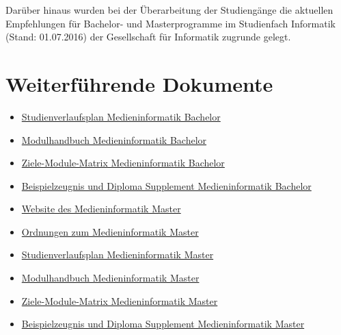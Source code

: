 Darüber hinaus wurden bei der Überarbeitung der Studiengänge die
aktuellen Empfehlungen für Bachelor- und Masterprogramme im Studienfach
Informatik (Stand: 01.07.2016) der Gesellschaft für Informatik zugrunde
gelegt.

\section{Weiterführende
Dokumente\label{/mi-2017/selbstbericht/0300-konzeptionelle-einordnung/0000-konzeptionelle-einordnung}}\label{weiterfuxfchrende-dokumentepathlabelmi-2017selbstbericht0300-konzeptionelle-einordnung0000-konzeptionelle-einordnung}

\begin{itemize}
\tightlist
\item
  \href{https://th-koeln.github.io/mi-2017/anhaenge/ba-studienverlaufsplan.pdf}{Studienverlaufsplan
  Medieninformatik Bachelor}
\item
  \href{https://th-koeln.github.io/mi-2017/download/modulbeschreibungen-bachelor.pdf}{Modulhandbuch
  Medieninformatik Bachelor}
\item
  \href{https://th-koeln.github.io/mi-2017/anhaenge/ba-Ziele-Module-Matrix-Medieninformatik-Bachelor.pdf}{Ziele-Module-Matrix
  Medieninformatik Bachelor}
\item
  \href{https://th-koeln.github.io/mi-2017/anhaenge/ba-zeugnis.pdf}{Beispielzeugnis und Diploma
  Supplement Medieninformatik Bachelor}
\item
  \href{https://www.th-koeln.de/studium/medieninformatik-master_3729.php}{Website
  des Medieninformatik Master}
\item
  \href{https://www.th-koeln.de/studium/medieninformatik-master--ordnungen-und-formulare_3724.php}{Ordnungen
  zum Medieninformatik Master}
\item
  \href{https://th-koeln.github.io/mi-2017/anhaenge/ma-studienverlaufsplan.pdf}{Studienverlaufsplan
  Medieninformatik Master}
\item
  \href{https://th-koeln.github.io/mi-2017/download/modulbeschreibungen-master.pdf}{Modulhandbuch
  Medieninformatik Master}
\item
  \href{https://th-koeln.github.io/mi-2017/anhaenge/ma-Ziele-Module-Matrix-Medieninformatik-Master.pdf}{Ziele-Module-Matrix
  Medieninformatik Master}
\item
  \href{https://th-koeln.github.io/mi-2017/anhaenge/ma-zeugnis.pdf}{Beispielzeugnis und Diploma
  Supplement Medieninformatik Master}
\end{itemize}

